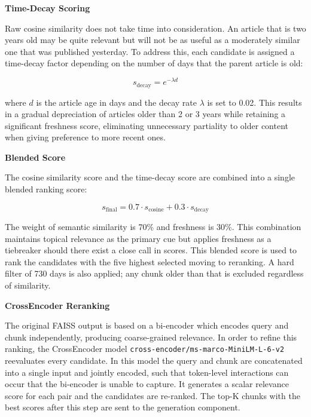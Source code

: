 \textbf{Time-Decay Scoring}

Raw cosine similarity does not take time into consideration. An article that is two years old may be quite relevant but will not be as useful as a moderately similar one that was published yesterday. To address this, each candidate is assigned a time-decay factor depending on the number of days that the parent article is old:

\begin{equation}
    s_{\text{decay}} = e^{-\lambda d}
\end{equation}

where $d$ is the article age in days and the decay rate $\lambda$ is set to 0.02. This results in a gradual depreciation of articles older than 2 or 3 years while retaining a significant freshness score, eliminating unnecessary partiality to older content when giving preference to more recent ones.

\textbf{Blended Score}

The cosine similarity score and the time-decay score are combined into a single blended ranking score:

\begin{equation}
    s_{\text{final}} = 0.7 \cdot s_{\text{cosine}} + 0.3 \cdot s_{\text{decay}}
\end{equation}

The weight of semantic similarity is 70\% and freshness is 30\%. This combination maintains topical relevance as the primary cue but applies freshness as a tiebreaker should there exist a close call in scores. This blended score is used to rank the candidates with the five highest selected moving to reranking. A hard filter of 730 days is also applied; any chunk older than that is excluded regardless of similarity.

\textbf{CrossEncoder Reranking}

The original FAISS output is based on a bi-encoder which encodes query and chunk independently, producing coarse-grained relevance. In order to refine this ranking, the CrossEncoder model \texttt{cross-encoder/ms-marco-MiniLM-L-6-v2} reevaluates every candidate. In this model the query and chunk are concatenated into a single input and jointly encoded, such that token-level interactions can occur that the bi-encoder is unable to capture. It generates a scalar relevance score for each pair and the candidates are re-ranked. The top-K chunks with the best scores after this step are sent to the generation component.

